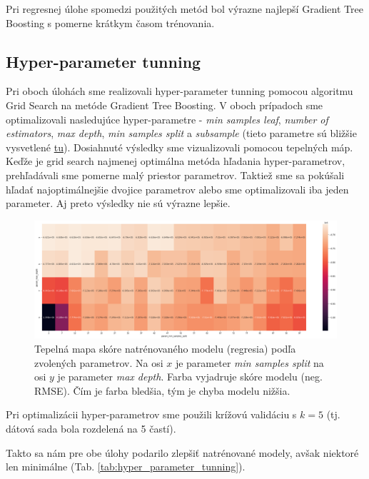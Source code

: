 \documentclass[runningheads]{llncs}
\begin{document}
Pri regresnej úlohe spomedzi použitých metód bol výrazne najlepší Gradient Tree Boosting s pomerne krátkym časom trénovania.

\subsection{Hyper-parameter tunning}

Pri oboch úlohách sme realizovali hyper-parameter tunning pomocou algoritmu Grid Search na metóde Gradient Tree Boosting. V oboch prípadoch sme optimalizovali nasledujúce hyper-parametre - \textit{min samples leaf}, \textit{number of estimators}, \textit{max depth}, \textit{min samples split} a \textit{subsample} (tieto parametre sú bližšie vysvetlené \href{https://scikit-learn.org/stable/modules/generated/sklearn.ensemble.GradientBoostingRegressor.html}{tu}). Dosiahnuté výsledky sme vizualizovali pomocou tepelných máp. Keďže je grid search najmenej optimálna metóda hľadania hyper-parametrov, prehľadávali sme pomerne malý priestor parametrov. Taktiež sme sa pokúšali hľadať najoptimálnejšie dvojice parametrov alebo sme optimalizovali iba jeden parameter. Aj preto výsledky nie sú výrazne lepšie.

\begin{figure}[htp]
    \centering
    \includegraphics[width=12cm]{images/hyper_parameter_tunning}
    \caption{Tepelná mapa skóre natrénovaného modelu (regresia) podľa zvolených parametrov. Na osi $x$ je parameter \textit{min samples split} na osi $y$ je parameter \textit{max depth}. Farba vyjadruje skóre modelu (neg. RMSE). Čím je farba bledšia, tým je chyba modelu nižšia.}
    \label{fig:hyper_parameter_tunning}
\end{figure}
 
Pri optimalizácii hyper-parametrov sme použili krížovú validáciu s $k=5$ (tj. dátová sada bola rozdelená na 5 častí).

Takto sa nám pre obe úlohy podarilo zlepšiť natrénované modely, avšak niektoré len minimálne (Tab. \ref{tab:hyper_parameter_tunning}).
\end{document}
